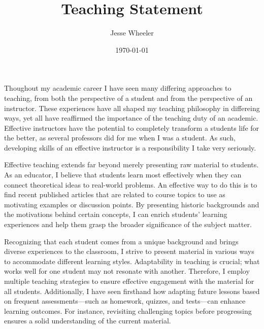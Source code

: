 \documentclass{article}
\title{Teaching Statement}
\author{Jesse Wheeler}
\date{\today}
\begin{document}
\rule{0mm}{1mm}
\vspace{-20mm}


\vspace{1mm}

\rule{0mm}{1mm}

\vspace{3mm}
\rule{0mm}{1mm}

\vspace{4mm}


\noindent Thoughout my academic career I have seen many differing approaches to teaching, from both the perspective of a student and from the perspective of an instructor.
These experiences have all shaped my teaching philosophy in differeing ways, yet all have reaffirmed the importance of the teaching duty of an academic.
Effective instructors have the potential to completely transform a students life for the better, as several professors did for me when I was a student.
As such, developing skills of an effective instructor is a responsibility I take very seriously.

Effective teaching extends far beyond merely presenting raw material to students.
As an educator, I believe that students learn most effectively when they can connect theoretical ideas to real-world problems.
An effective way to do this is to find recent published articles that are related to course topics to use as motivating examples or discussion points.
By presenting historic backgrounds and the motivations behind certain concepts, I can enrich students' learning experiences and help them grasp the broader significance of the subject matter.

Recognizing that each student comes from a unique background and brings diverse experiences to the classroom, I strive to present material in various ways to accommodate different learning styles.
Adaptability in teaching is crucial; what works well for one student may not resonate with another.
Therefore, I employ multiple teaching strategies to ensure effective engagement with the material for all students.
Additionally, I have seen firsthand how adapting future lessons based on frequent assessments—such as homework, quizzes, and tests—can enhance learning outcomes.
For instance, revisiting challenging topics before progressing ensures a solid understanding of the current material.
\end{document}
